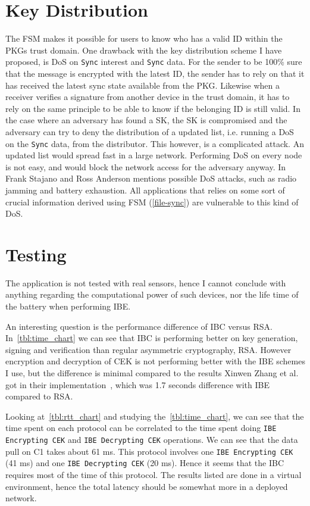 \section{Key Distribution}
The \gls{FSM} makes it possible for users to know who has a valid \gls{ID} within the \gls{PKG}s trust domain.
One drawback with the key distribution scheme I have proposed, is \gls{DoS} on \texttt{Sync} \gls{interest} and \texttt{Sync} \gls{data}. 
For the sender to be 100\% sure that the message is encrypted with the latest \gls{ID}, the sender has to rely on that it has received the latest sync state available from the \gls{PKG}.
Likewise when a receiver verifies a signature from another device in the trust domain, it has to rely on the same principle to be able to know if the belonging \gls{ID} is still valid.
In the case where an adversary has found a \gls{SK}, the \gls{SK} is compromised and the adversary can try to deny the distribution of a updated list, i.e. running a \gls{DoS} on the \texttt{Sync} \gls{data}, from the distributor. 
This however, is a complicated attack.
An updated list would spread fast in a large network.
Performing \gls{DoS} on every node is not easy, and would block the network access for the adversary anyway.
In~\cite{DBLP:conf/spw/StajanoA99} Frank Stajano and Ross Anderson mentions possible \gls{DoS} attacks, such as radio jamming and battery exhaustion. 
All applications that relies on some sort of crucial information derived using \gls{FSM} (\autoref{file-sync}) are vulnerable to this kind of \gls{DoS}.

\section{Testing}
The application is not tested with real sensors, hence I cannot conclude with anything regarding the computational power of such devices, nor the life time of the battery when performing \gls{IBE}.

An interesting question is the performance difference of \gls{IBC} versus RSA.
In~\autoref{tbl:time_chart} we can see that \gls{IBC} is performing better on key generation, signing and verification than regular asymmetric cryptography, RSA. 
However encryption and decryption of \gls{CEK} is not performing better with the \gls{IBE} schemes I use, but the difference is minimal compared to the results Xinwen Zhang et al. got in their implementation~\cite{DBLP:conf/icnp/ZhangCXWSW11}, which was 1.7 seconds difference with \gls{IBE} compared to RSA.

Looking at~\autoref{tbl:rtt_chart} and studying the~\autoref{tbl:time_chart}, we can see that the time spent on each protocol can be correlated to the time spent doing \texttt{IBE Encrypting \gls{CEK}} and \texttt{IBE Decrypting \gls{CEK}} operations. 
We can see that the data pull on C1 takes about 61 ms.
This protocol involves one \texttt{IBE Encrypting \gls{CEK}} (41 ms) and one \texttt{IBE Decrypting \gls{CEK}} (20 ms). 
Hence it seems that the \gls{IBC} requires most of the time of this protocol.
The results listed are done in a virtual environment, hence the total latency should be somewhat more in a deployed network.

